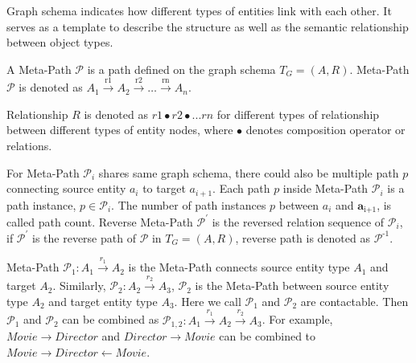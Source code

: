 Graph schema indicates how different types of entities link with each other. It serves as a template to describe the structure as well as the semantic relationship between object types.
\begin{definition}\label{def:metaPath}
A Meta-Path $\mathcal{P}$ is a path defined on the  graph schema $T_G = (A, R)$. \newline
Meta-Path $\mathcal{P}$ is denoted as $A_1 \xrightarrow{\text{r1}} A_2 \xrightarrow{\text{r2}} \dots \xrightarrow{\text{rn}} A_n$. 

Relationship $R$ is denoted as $r1 \bullet r2 \bullet ... rn$ for different types of relationship between different types of entity nodes, where $\bullet $ denotes composition operator or relations.
\end{definition}

For Meta-Path $\mathcal{P}_i$ shares same graph schema, there could also be multiple path $p$ connecting source entity $a_i$ to target ${a}_{i+1}$. Each path $p$ inside Meta-Path $\mathcal{P}_i$ is a path instance, $p \in \mathcal{P}_i$. The number of path instances $p$ between $a_i$ and $\bm{a}_\text{i+1}$, is called path count. Reverse Meta-Path $\mathcal{P}^{'}$ is the reversed relation sequence of $\mathcal{P}_i$, if $\mathcal{P}^{'}$ is the reverse path of $\mathcal{P}$ in $T_G = (A, R)$, reverse path is denoted as $\mathcal{P}^\text{-1}$. \newline

Meta-Path $\mathcal{P}_1: A_1 \xrightarrow{r_1} A_2$ is the Meta-Path connects source entity type $A_1$ and target $A_2$.
Similarly, $\mathcal{P}_2: A_2 \xrightarrow{r_2} A_3$, $\mathcal{P}_2$ is the Meta-Path between source entity type $A_\text{2}$ and target entity type $A_\text{3}$.
Here we call $\mathcal{P}_1$ and $\mathcal{P}_2$ are contactable. Then $\mathcal{P}_1$ and $\mathcal{P}_2$ can be combined as $\mathcal{P}_{1,2}: A_1 \xrightarrow{r_1} A_2 \xrightarrow{r_2} A_3$. For example, $Movie \rightarrow Director$ and $Director \rightarrow Movie$ can be combined to $Movie \rightarrow Director \leftarrow Movie$. 
